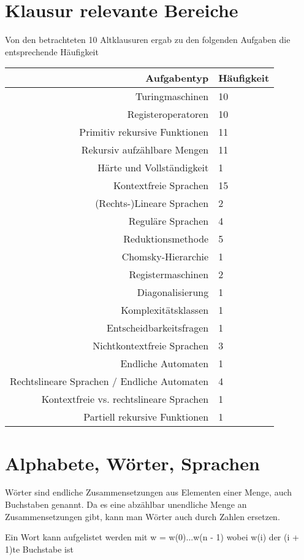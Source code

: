 \documentclass[12pt,a4paper]{article} %
\begin{document}
	\tableofcontents
	
	\newpage
	\section{Klausur relevante Bereiche}
	Von den betrachteten 10 Altklausuren ergab zu den folgenden Aufgaben die entsprechende Häufigkeit
	
	\begin{tabular}{r | l}
		Aufgabentyp & Häufigkeit \\ \hline
		Turingmaschinen & 10 \\
		Registeroperatoren & 10 \\
		Primitiv rekursive Funktionen & 11 \\
		Rekursiv aufzählbare Mengen & 11 \\
		Härte und Vollständigkeit & 1 \\
		Kontextfreie Sprachen & 15 \\
		(Rechts-)Lineare Sprachen & 2 \\
		Reguläre Sprachen & 4 \\
		Reduktionsmethode & 5 \\
		Chomsky-Hierarchie & 1 \\
		Registermaschinen & 2 \\
		Diagonalisierung & 1 \\
		Komplexitätsklassen & 1 \\
		Entscheidbarkeitsfragen & 1 \\
		Nichtkontextfreie Sprachen & 3 \\
		Endliche Automaten & 1 \\
		Rechtslineare Sprachen / Endliche Automaten & 4 \\
		Kontextfreie vs. rechtslineare Sprachen & 1 \\
		Partiell rekursive Funktionen & 1 \\
	\end{tabular}
	
	\newpage
	\section{Alphabete, Wörter, Sprachen}
	Wörter sind endliche Zusammensetzungen aus Elementen einer Menge, auch Buchstaben genannt. Da es eine abzählbar unendliche Menge an Zusammensetzungen gibt, kann man Wörter auch durch Zahlen ersetzen. 
	
	Ein Wort kann aufgelistet werden mit w = w(0)...w(n - 1) wobei w(i) der (i + 1)te Buchstabe ist
	
\end{document}
